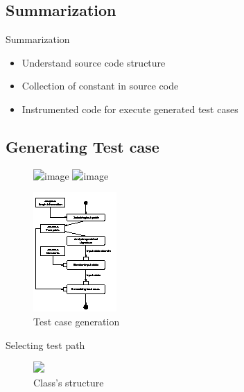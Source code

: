 \documentclass{beamer}
\begin{document}
\subsection{Summarization}
\begin{frame}{Summarization}
    \begin{itemize}
        \item Understand source code structure
        \item Collection of constant in source code
        \item Instrumented code for execute generated test cases
    \end{itemize}
\end{frame}

\subsection{Generating Test case}
\begin{frame}
    \begin{figure}
        \includegraphics<1>[height=0.8\paperheight]{figure/Methodology}
        \includegraphics<2>[height=0.8\paperheight]{figure/Methodology-Highlight-1}
    \end{figure}
\end{frame}

\begin{frame}
    \begin{figure}
        \includegraphics[height=.8\paperheight]{figure/Activities}
        \caption{Test case generation}
        \label{fig:testcasegenearation}
    \end{figure}
\end{frame}

\begin{frame}{Selecting test path}
    \begin{figure}
        \includegraphics<1>[width=.8\paperwidth]{figure/psuedo-classes-connection}
        \caption{Class's structure}
        \label{fig:classStructure}
    \end{figure}
\end{frame}
\end{document}
